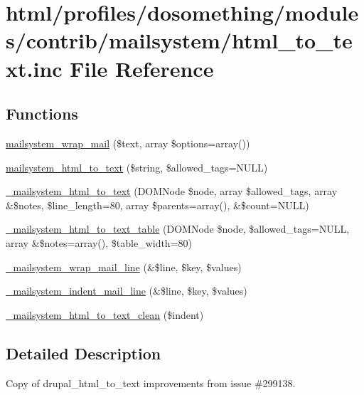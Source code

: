 \hypertarget{html__to__text_8inc}{
\section{html/profiles/dosomething/modules/contrib/mailsystem/html\_\-to\_\-text.inc File Reference}
\label{html__to__text_8inc}
}
\subsection*{Functions}
\begin{DoxyCompactItemize}
\item 
\hyperlink{html__to__text_8inc_a7137e9a046abb0bc57ad54a580612474}{mailsystem\_\-wrap\_\-mail} (\$text, array \$options=array())
\item 
\hyperlink{html__to__text_8inc_abd38fa306fb704f7e880c034042768b2}{mailsystem\_\-html\_\-to\_\-text} (\$string, \$allowed\_\-tags=NULL)
\item 
\hyperlink{html__to__text_8inc_af581a74a8de0f0cbedc673623bccdc5d}{\_\-mailsystem\_\-html\_\-to\_\-text} (DOMNode \$node, array \$allowed\_\-tags, array \&\$notes, \$line\_\-length=80, array \$parents=array(), \&\$count=NULL)
\item 
\hyperlink{html__to__text_8inc_aaae86eca3d53d44fb34d4a64db93ae89}{\_\-mailsystem\_\-html\_\-to\_\-text\_\-table} (DOMNode \$node, \$allowed\_\-tags=NULL, array \&\$notes=array(), \$table\_\-width=80)
\item 
\hyperlink{html__to__text_8inc_af062b4bc2cb10c61afac44647167bd19}{\_\-mailsystem\_\-wrap\_\-mail\_\-line} (\&\$line, \$key, \$values)
\item 
\hyperlink{html__to__text_8inc_ad77a7dffe89d0b6cb337b0f36bdb64b3}{\_\-mailsystem\_\-indent\_\-mail\_\-line} (\&\$line, \$key, \$values)
\item 
\hyperlink{html__to__text_8inc_a33422aa7297978d57f41144ae705ed60}{\_\-mailsystem\_\-html\_\-to\_\-text\_\-clean} (\$indent)
\end{DoxyCompactItemize}


\subsection{Detailed Description}
Copy of drupal\_\-html\_\-to\_\-text improvements from issue \#299138. 


